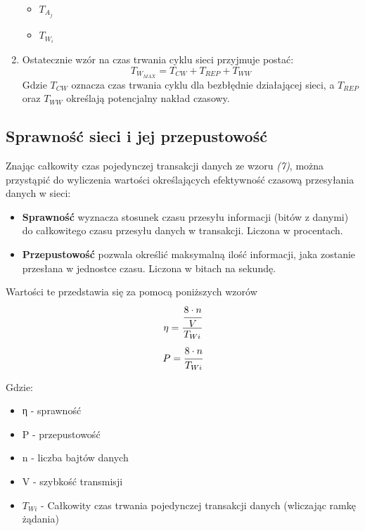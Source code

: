 \documentclass[a4paper,twoside]{article}
\begin{document}
\begin{enumerate}
\begin{itemize}
			\item $ T_{A_j} $ 
			\item $ T_{W_i} $ 
		\end{itemize}
		\item Ostatecznie wzór na czas trwania cyklu sieci przyjmuje postać:
		\begin{equation}
			T_{W_{MAX}}=T_{CW}+T_{REP}+T_{WW}
		\end{equation}
		Gdzie $ T_{CW} $ oznacza czas trwania cyklu dla bezbłędnie działającej sieci, a $ T_{REP} $ oraz $ T_{WW} $ określają potencjalny nakład czasowy.
	\end{enumerate}

	\subsection{Sprawność sieci i jej przepustowość}
	Znając całkowity czas pojedynczej transakcji danych ze wzoru \textit{(7)}, można przystąpić do wyliczenia wartości określających efektywność czasową przesyłania danych w sieci:
	\begin{itemize}
		\item \textbf{Sprawność} wyznacza stosunek czasu przesyłu informacji (bitów z danymi) do całkowitego czasu przesyłu danych w transakcji. Liczona w procentach.
		\item \textbf{Przepustowość} pozwala określić maksymalną ilość informacji, jaka zostanie przesłana w jednostce czasu. Liczona w bitach na sekundę.
	\end{itemize}
	
	Wartości te przedstawia się za pomocą poniższych wzorów
	\begin{equation}
	\eta = \cfrac{\cfrac{8\cdot n}{V}}{T_{Wi}}   
	\end{equation}
	\begin{equation}
	P = \cfrac{8\cdot n}{T_{Wi}}
	\end{equation}
	
	Gdzie:
	\begin{itemize}
		\item η - sprawność
		\item P - przepustowość
		\item n - liczba bajtów danych
		\item V - szybkość transmisji
		\item $ T_{Wi} $ - Całkowity czas trwania pojedynczej transakcji danych (wliczając ramkę żądania)
	\end{itemize}
	
\end{document}
